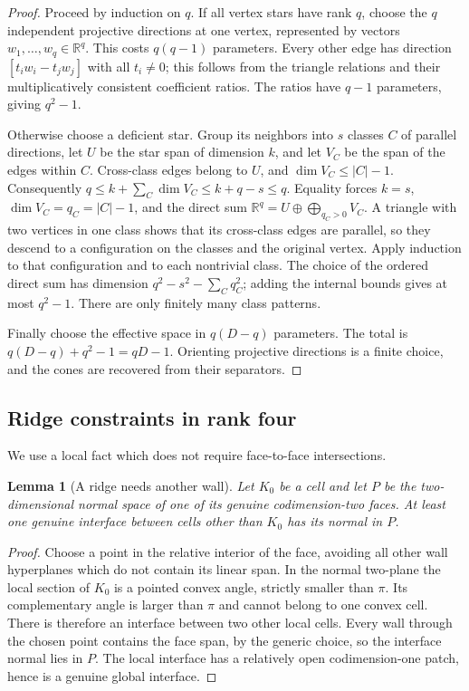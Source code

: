 \documentclass[a4paper,11pt,reqno]{amsart}
\newcommand{\R}{\mathbb R}
\newtheorem{lemma}[theorem]{Lemma}
\theoremstyle{definition}
\theoremstyle{remark}
\numberwithin{equation}{section}
\begin{document}
\begin{proof}
Proceed by induction on $q$. If all vertex stars have rank $q$, choose
the $q$ independent projective directions at one vertex, represented by
vectors $w_1,\ldots,w_q\in\R^q$. This costs $q(q-1)$ parameters. Every other edge has direction
$[t_iw_i-t_jw_j]$ with all $t_i\ne0$; this follows from the triangle
relations and their multiplicatively consistent coefficient ratios.
The ratios have $q-1$ parameters, giving $q^2-1$.

Otherwise choose a deficient star. Group its neighbors into $s$ classes
$C$ of parallel directions, let $U$ be the star span of dimension $k$,
and let $V_C$ be the span of the edges within $C$. Cross-class edges
belong to $U$, and $\dim V_C\le |C|-1$. Consequently
$q\le k+\sum_C\dim V_C\le k+q-s\le q$.
Equality forces $k=s$, $\dim V_C=q_C=|C|-1$, and the direct sum
$\R^q=U\oplus\bigoplus_{q_C>0}V_C$.
A triangle with two vertices in one class shows that its cross-class
edges are parallel, so they descend to a configuration on the classes
and the original vertex. Apply induction to that configuration and
to each nontrivial class. The choice of the ordered direct sum has
dimension $q^2-s^2-\sum_Cq_C^2$; adding the internal bounds gives
at most $q^2-1$. There are only finitely many class patterns.

Finally choose the effective space in $q(D-q)$ parameters. The total
is $q(D-q)+q^2-1=qD-1$. Orienting projective directions is a finite
choice, and the cones are recovered from their separators.
\end{proof}

\subsection{Ridge constraints in rank four}
We use a local fact which does not require face-to-face intersections.

\begin{lemma}[A ridge needs another wall]\label{lem:ridge}
Let $K_0$ be a cell and let $P$ be the two-dimensional normal space
of one of its genuine codimension-two faces. At least one genuine
interface between cells other than $K_0$ has its normal in $P$.
\end{lemma}
\begin{proof}
Choose a point in the relative interior of the face, avoiding all
other wall hyperplanes which do not contain its linear span. In the
normal two-plane the local section of $K_0$ is a pointed convex angle,
strictly smaller than $\pi$. Its complementary angle is larger than
$\pi$ and cannot belong to one convex cell. There is therefore an
interface between two other local cells. Every wall through the chosen
point contains the face span, by the generic choice, so the interface
normal lies in $P$. The local interface has a relatively open
codimension-one patch, hence is a genuine global interface.
\end{proof}
\end{document}
